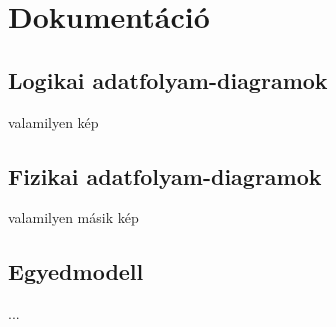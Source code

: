 \section{Dokumentáció}\label{sec:dokumentacio}

\subsection{Logikai adatfolyam-diagramok}
valamilyen kép

\subsection{Fizikai adatfolyam-diagramok}
valamilyen másik kép

\subsection{Egyedmodell}
...
